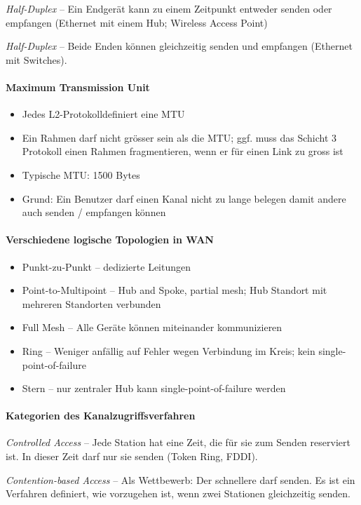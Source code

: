 \documentclass[a4paper,12pt]{article}
\begin{document}
\emph{Half-Duplex} -- Ein Endgerät kann zu einem Zeitpunkt entweder senden oder empfangen (Ethernet mit einem Hub; Wireless Access Point)

\emph{Half-Duplex} -- Beide Enden können gleichzeitig senden und empfangen (Ethernet mit Switches).

\paragraph{Maximum Transmission Unit}
\begin{itemize}
\item Jedes L2-Protokolldefiniert eine MTU
\item Ein Rahmen darf nicht grösser sein als die MTU; ggf. muss das Schicht 3 Protokoll einen Rahmen fragmentieren, wenn er für einen Link zu gross ist
\item Typische MTU: 1500 Bytes
\item Grund: Ein Benutzer darf einen Kanal nicht zu lange belegen damit andere auch senden / empfangen können
\end{itemize}

\paragraph{Verschiedene logische Topologien in WAN}
\begin{itemize}
\item Punkt-zu-Punkt -- dedizierte Leitungen
\item Point-to-Multipoint -- Hub and Spoke, partial mesh; Hub Standort mit mehreren Standorten verbunden
\item Full Mesh -- Alle Geräte können miteinander kommunizieren
\item Ring -- Weniger anfällig auf Fehler wegen Verbindung im Kreis; kein single-point-of-failure
\item Stern -- nur zentraler Hub kann single-point-of-failure werden
\end{itemize}


\paragraph{Kategorien des Kanalzugriffsverfahren}
\emph{Controlled Access} -- Jede Station hat eine Zeit, die für sie zum Senden reserviert ist. In dieser Zeit darf nur sie senden (Token Ring, FDDI).

\emph{Contention-based Access} -- Als Wettbewerb: Der schnellere darf senden. Es ist ein Verfahren definiert, wie vorzugehen ist, wenn zwei Stationen gleichzeitig senden.
\end{document}

